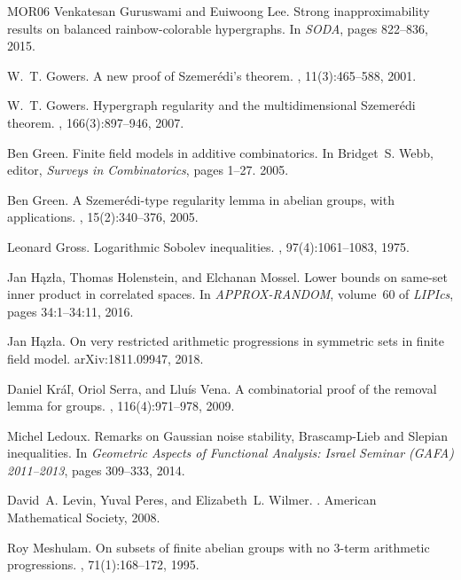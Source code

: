 \documentclass{daj}
\newcommand{\1}{\mathbbm{1}}
\theoremstyle{plain}
\theoremstyle{definition}
\begin{document}
\begin{thebibliography}{MOR{\etalchar{+}}06}
Venkatesan Guruswami and Euiwoong Lee.
\newblock Strong inapproximability results on balanced rainbow-colorable
  hypergraphs.
\newblock In {\em SODA}, pages 822--836, 2015.

W.~T. Gowers.
\newblock A new proof of {S}zemerédi's theorem.
, 11(3):465--588, 2001.

W.~T. Gowers.
\newblock Hypergraph regularity and the multidimensional {S}zemerédi theorem.
, 166(3):897--946, 2007.

Ben Green.
\newblock Finite field models in additive combinatorics.
\newblock In Bridget~S. Webb, editor, {\em Surveys in Combinatorics}, pages
  1--27. 2005.

Ben Green.
\newblock A {S}zemer{\'e}di-type regularity lemma in abelian groups, with
  applications.
, 15(2):340--376, 2005.

Leonard Gross.
\newblock Logarithmic {S}obolev inequalities.
, 97(4):1061--1083, 1975.

Jan Hązła, Thomas Holenstein, and Elchanan Mossel.
\newblock Lower bounds on same-set inner product in correlated spaces.
\newblock In {\em APPROX-RANDOM}, volume~60 of {\em LIPIcs}, pages 34:1--34:11,
  2016.

Jan H{ą}zła.
\newblock On very restricted arithmetic progressions in symmetric sets in
  finite field model.
\newblock arXiv:1811.09947, 2018.

Daniel Krá\v{l}, Oriol Serra, and Lluís Vena.
\newblock A combinatorial proof of the removal lemma for groups.
, 116(4):971--978,
  2009.

Michel Ledoux.
\newblock Remarks on {G}aussian noise stability, {B}rascamp-{L}ieb and
  {S}lepian inequalities.
\newblock In {\em Geometric Aspects of Functional Analysis: Israel Seminar
  (GAFA) 2011--2013}, pages 309--333, 2014.

David~A. Levin, Yuval Peres, and Elizabeth~L. Wilmer.
.
\newblock American Mathematical Society, 2008.

Roy Meshulam.
\newblock On subsets of finite abelian groups with no 3-term arithmetic
  progressions.
, 71(1):168--172,
  1995.


\end{thebibliography}
\end{document}
